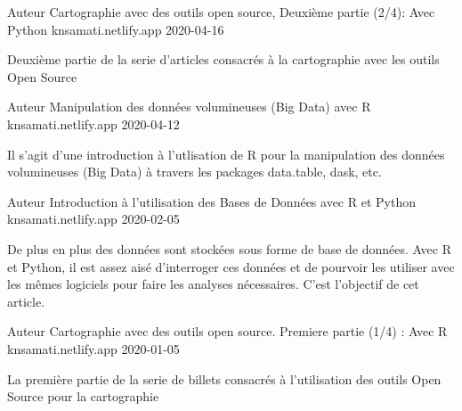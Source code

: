 

\begin{cventries}

  \cventry
    {Auteur} %
    {Cartographie avec des outils open source, Deuxième partie (2/4): Avec Python} %
    {knsamati.netlify.app} %
    {2020-04-16} %
    {
      \begin{cvitems} %
        \item {Deuxième partie de la serie d'articles consacrés à la cartographie avec les outils Open Source}
      \end{cvitems}
    }

  \cventry
    {Auteur} %
    {Manipulation des données volumineuses (Big Data) avec R} %
    {knsamati.netlify.app} %
    {2020-04-12} %
    {
      \begin{cvitems} %
        \item {Il s'agit d'une introduction à l'utlisation de R pour la manipulation des données volumineuses (Big Data) à travers les packages data.table, dask, etc.}
      \end{cvitems}
    }

 \cventry
    {Auteur} %
    {Introduction à l'utilisation des Bases de Données avec R et Python} %
    {knsamati.netlify.app} %
    {2020-02-05} %
    {
      \begin{cvitems} %
        \item {De plus en plus des données sont stockées sous forme de base de données. Avec R et Python, il est assez aisé d'interroger ces données et de pourvoir les utiliser avec les mêmes logiciels pour faire les analyses nécessaires. C'est l'objectif de cet article.}
      \end{cvitems}
    }

 \cventry
    {Auteur} %
    {Cartographie avec des outils open source. Premiere partie (1/4) : Avec R} %
    {knsamati.netlify.app} %
    {2020-01-05} %
    {
      \begin{cvitems} %
        \item {La première partie de la serie de billets consacrés à l'utilisation des outils Open Source pour la cartographie}
      \end{cvitems}
    }


\end{cventries}
